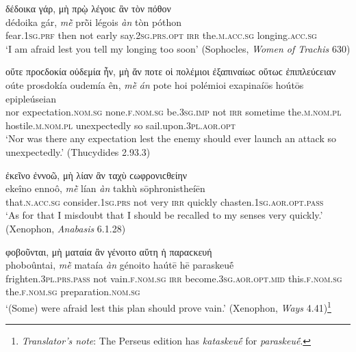 \begin{exe}
\ex δέδοικα γάρ, μὴ πρῲ λέγοιϲ ἂν τὸν πόθον\\
\gll dédoika gár, \emph{mḕ} prṑi légois \emph{àn} tòn póthon\\
fear.\textsc{1sg.prf} then not early say.\textsc{2sg.prs.opt} \textsc{irr} the.\textsc{m.acc.sg} longing.\textsc{acc.sg}\\
\trans `I am afraid lest you tell my longing too soon' (Sophocles, \textit{Women of Trachis} 630)
\label{fearan1}
\end{exe}

\begin{exe}
\ex οὔτε προϲδοκία οὐδεμία ἦν, μὴ ἄν ποτε οἱ πολέμιοι ἐξαπιναίωϲ οὕτωϲ ἐπιπλεύϲειαν\\
\gll oúte prosdokía oudemía ên, \emph{mḕ} \emph{án} pote hoi polémioi exapinaíōs hoútōs epipleúseian\\
nor expectation.\textsc{nom.sg} none.\textsc{f.nom.sg} be.\textsc{3sg.imp} not \textsc{irr} sometime the.\textsc{m.nom.pl} hostile.\textsc{m.nom.pl} unexpectedly so sail.upon.\textsc{3pl.aor.opt}\\
\trans `Nor was there any expectation lest the enemy should ever launch an attack so unexpectedly.' (Thucydides 2.93.3)
\label{fearan2}
\end{exe}

\begin{exe}
\ex ἐκεῖνο ἐννοῶ, μὴ λίαν ἂν ταχὺ ϲωφρονιϲθείην\\
\gll ekeîno ennoô, \emph{mḕ} lían \emph{àn} takhù sōphronistheíēn\\
that.\textsc{n.acc.sg} consider.\textsc{1sg.prs} not very \textsc{irr} quickly chasten.\textsc{1sg.aor.opt.pass}\\
\trans `As for that I misdoubt that I should be recalled to my senses very quickly.' (Xenophon, \textit{Anabasis} 6.1.28)
\label{fearan3}
\end{exe}

\begin{exe}
\ex φοβοῦνται, μὴ ματαία ἂν γένοιτο αὕτη ἡ παραϲκευή\\
\gll phoboûntai, \emph{mḕ} mataía \emph{àn} génoito haútē hē paraskeuḗ\\
frighten.\textsc{3pl.prs.pass} not vain.\textsc{f.nom.sg} \textsc{irr} become.\textsc{3sg.aor.opt.mid} this.\textsc{f.nom.sg} the.\textsc{f.nom.sg} preparation.\textsc{nom.sg}\\
\trans `(Some) were afraid lest this plan should prove vain.' (Xenophon, \textit{Ways} 4.41)\footnote{\emph{Translator's note}: The Perseus edition has \textit{kataskeuḗ} for \textit{paraskeuḗ}.}
\label{fearan4}
\end{exe}

